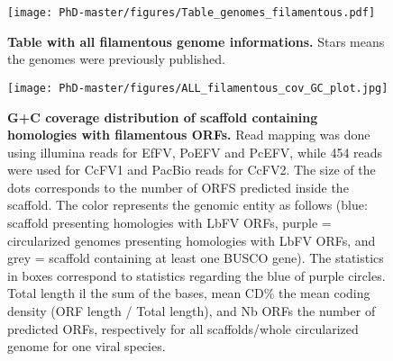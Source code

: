 \begin{figure}[!htpbt]
\texttt{[image: PhD-master/figures/Table\_genomes\_filamentous.pdf]}\centering
\caption[Paper2:Filamentous genomes informations]{\textbf{Table with all filamentous genome informations.} Stars means the genomes were previously published.}
\label{figure:Table_genomes_filamentous}
\end{figure}

\begin{figure}[!htpbt]
\texttt{[image: PhD-master/figures/ALL\_filamentous\_cov\_GC\_plot.jpg]}\centering
\caption[Paper2:Filamentous virus COV/GC content]{\textbf{G+C coverage distribution of scaffold containing homologies with filamentous ORFs.} Read mapping was done using illumina reads for EfFV, PoEFV and PcEFV, while 454 reads were used for CcFV1 and PacBio reads for CcFV2. The size of the dots corresponds to the number of ORFS predicted inside the scaffold. The color represents the genomic entity as follows (blue: scaffold presenting homologies with LbFV ORFs, purple = circularized genomes presenting homologies with LbFV ORFs, and grey = scaffold containing at least one BUSCO gene). The statistics in boxes correspond to statistics regarding the blue of purple circles. Total length il the sum of the bases, mean CD\% the mean coding density (ORF length / Total length), and Nb ORFs the number of predicted ORFs, respectively for all scaffolds/whole circularized genome for one viral species.}
\label{figure:ALL_filamentous_cov_GC_plot}
\end{figure}


